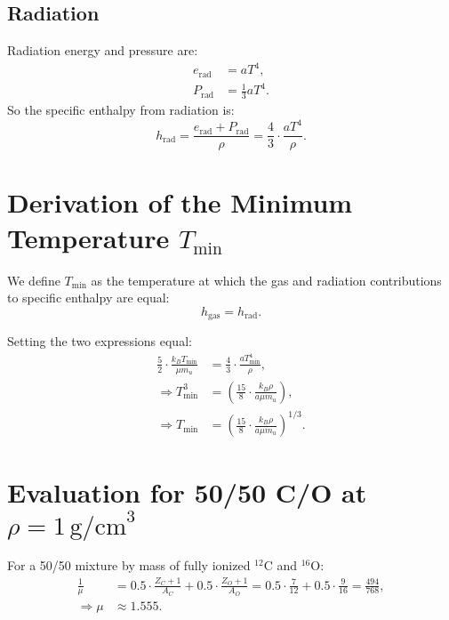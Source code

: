 \documentclass[12pt]{article}
\begin{document}
\subsection*{Radiation}

Radiation energy and pressure are:
\begin{align}
    e_{\text{rad}} &= a T^4, \\
    P_{\text{rad}} &= \frac{1}{3} a T^4.
\end{align}
So the specific enthalpy from radiation is:
\begin{equation}
    h_{\text{rad}} = \frac{e_{\text{rad}} + P_{\text{rad}}}{\rho} 
    = \frac{4}{3} \cdot \frac{a T^4}{\rho}.
\end{equation}

\section*{Derivation of the Minimum Temperature \( T_{\min} \)}

We define \( T_{\min} \) as the temperature at which the gas and radiation contributions to specific enthalpy are equal:
\begin{equation}
    h_{\text{gas}} = h_{\text{rad}}.
\end{equation}

Setting the two expressions equal:
\begin{align}
    \frac{5}{2} \cdot \frac{k_B T_{\min}}{\mu m_u} &= \frac{4}{3} \cdot \frac{a T_{\min}^4}{\rho}, \\
    \Rightarrow T_{\min}^3 &= \left( \frac{15}{8} \cdot \frac{k_B \rho}{a \mu m_u} \right), \\
    \Rightarrow T_{\min} &= \left( \frac{15}{8} \cdot \frac{k_B \rho}{a \mu m_u} \right)^{1/3}.
\end{align}

\section*{Evaluation for 50/50 C/O at \( \rho = 1 \, \text{g/cm}^3 \)}

For a 50/50 mixture by mass of fully ionized $^{12}$C and $^{16}$O:
\begin{align}
    \frac{1}{\mu} &= 0.5 \cdot \frac{Z_C + 1}{A_C} + 0.5 \cdot \frac{Z_O + 1}{A_O}
    = 0.5 \cdot \frac{7}{12} + 0.5 \cdot \frac{9}{16}
    = \frac{494}{768}, \\
    \Rightarrow \mu &\approx 1.555.
\end{align}
\end{document}
